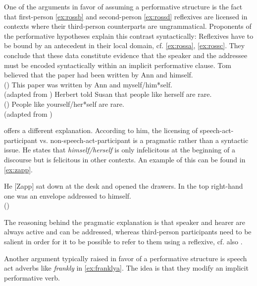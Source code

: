 One of the arguments in favor of assuming a performative structure is the fact that
first-person \eqref{ex:rossb} and second-person \eqref{ex:rossd} reflexives are licensed in contexts where
their third-person counterparts are ungrammatical. Proponents of the performative hypotheses explain this contrast syntactically: Reflexives have to be bound by
 an antecedent in their local domain, cf.  \eqref{ex:rossa}, \eqref{ex:rossc}. They conclude that these data constitute evidence that the speaker and the addressee must be encoded syntactically within an implicit
performative clause.
\ea
\ea\label{ex:rossa} Tom believed that the paper had been written by Ann and himself.
\\
(\citealt[226: ex 11b]{Ross1970})
			\ex \label{ex:rossb} This paper was written by Ann and myself/him*self.\\
				(adapted from \citealt[228: ex 21a]{Ross1970})
			\ex \label{ex:rossc} Herbert told Susan that people like herself are rare. \\
			(\citealt[248: ex 33]{Levinson1983})
		\ex \label{ex:rossd} People like yourself/her*self are rare.	\\
		(adapted from \citealt[248: ex 34]{Levinson1983})
	\z
\z

\citet{Levinson1983} offers a different explanation. According to him, the licensing of speech-act-participant vs. non-speech-act-participant is a pragmatic rather than a
syntactic issue. He states that \emph{himself/herself} is only infelicitous at the beginning of a
 discourse but is felicitous in other contexts. An example of this can be found in \eqref{ex:zapp}.

\ea \label{ex:zapp}
He [Zapp] sat down at the desk and opened the drawers. In the top right-hand
one was an envelope addressed to himself. \\(\citealt[716: ex 65]{Zribi-Hertz1989})
\z

The reasoning behind the pragmatic explanation is that speaker and hearer are always active
and can be addressed, whereas third-person participants need to be salient in order for it to be possible to refer to them using a reflexive, cf. also  . 

\begin{sloppypar}
Another argument typically raised in favor of a performative structure is speech
act adverbs like \emph{frankly} in \eqref{ex:franklya}. The idea is that they modify an implicit performative
verb.
\end{sloppypar}

